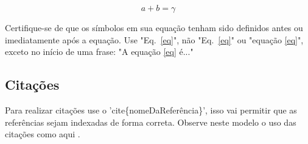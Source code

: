 \begin{equation}
a+b=\gamma\label{eq}
\end{equation}

Certifique-se de que os símbolos em sua equação tenham sido definidos antes ou imediatamente após a equação. Use "Eq.~\eqref{eq}", não "Eq.~\eqref{eq}" ou "equação \eqref{eq}", exceto no início de uma frase: "A equação \eqref{eq} é..."

\subsection{Citações}

Para realizar citações use o 'cite\{nomeDaReferência\}', isso vai permitir que as referências sejam indexadas de forma correta. Observe neste modelo o uso das citações como aqui \cite{al2010image}.